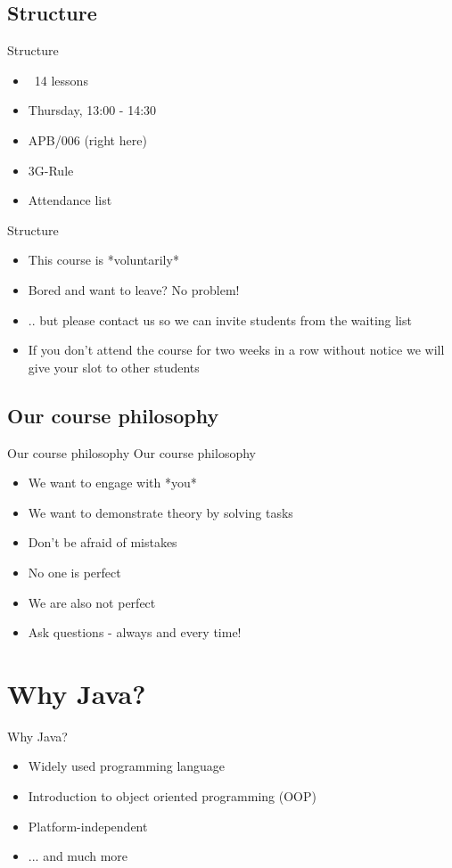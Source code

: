 \subsection{Structure}
\begin{frame}{Structure}
	\begin{itemize}[<+->]
		\item ~14 lessons
		\item Thursday, 13:00 - 14:30
		\item APB/006 (right here)
		\item 3G-Rule
		\item Attendance list
	\end{itemize}
\end{frame}

\begin{frame}{Structure}
	\begin{itemize}[<+->]
		\item This course is *voluntarily*
		\item Bored and want to leave? No problem!
		\item[]	.. but please contact us so we can invite students from the waiting list
		\item If you don't attend the course for two weeks in a row without notice we will give your slot to other students
	\end{itemize}
\end{frame}

\subsection{Our course philosophy}
\begin{frame}{Our course philosophy}
	Our course philosophy
	\begin{itemize}[<+->]
		\item We want to engage with *you*
		\item We want to demonstrate theory by solving tasks
		\item Don't be afraid of mistakes
		\item No one is perfect
		\item We are also not perfect
		\item Ask questions - always and every time!
	\end{itemize}
\end{frame}


\section{Why Java?}
\begin{frame}{Why Java?}
	\begin{itemize}
		\item Widely used programming language
		\item Introduction to object oriented programming (OOP)
		\item Platform-independent
		\item ... and much more
	\end{itemize}
\end{frame}

